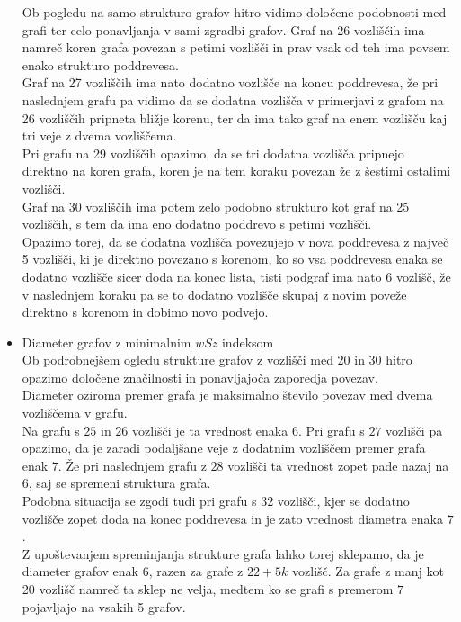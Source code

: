 \documentclass[12pt, a4paper]{article}
\begin{document}
\begin{itemize}
Ob pogledu na samo strukturo grafov hitro vidimo določene podobnosti med grafi ter celo ponavljanja v sami zgradbi grafov. Graf na 26 vozliščih ima namreč koren grafa povezan s petimi vozlišči in prav vsak od teh ima povsem enako strukturo poddrevesa. \\
Graf na 27 vozliščih ima nato dodatno vozlišče na koncu poddrevesa, že pri naslednjem grafu pa vidimo da se dodatna vozlišča v primerjavi z grafom na 26 vozliščih pripneta bližje korenu, ter da ima tako graf na enem vozlišču kaj tri veje z dvema vozliščema. \\
Pri grafu na 29 vozliščih opazimo, da se tri dodatna vozlišča pripnejo direktno na koren grafa, koren je na tem koraku povezan že z šestimi ostalimi vozlišči. \\
Graf na 30 vozliščih ima potem zelo podobno strukturo kot graf na 25 vozliščih, s tem da ima eno dodatno poddrevo s petimi vozlišči. \\
Opazimo torej, da se dodatna vozlišča povezujejo v nova poddrevesa z največ 5 vozlišči, ki je direktno povezano s korenom, ko so vsa poddrevesa enaka se dodatno vozlišče sicer doda na konec lista, tisti podgraf ima nato 6 vozlišč, že v naslednjem koraku pa se to dodatno vozlišče skupaj z novim poveže direktno s korenom in dobimo novo podvejo. 

\newpage

\large  \item  Diameter grafov z minimalnim $wSz$ indeksom\\ \linebreak
Ob podrobnejšem ogledu strukture grafov z vozlišči med 20 in 30 hitro opazimo določene značilnosti in ponavljajoča zaporedja povezav. \\
Diameter oziroma premer grafa je maksimalno število povezav med dvema vozliščema v grafu. \\
Na grafu s $25$ in $26$ vozlišči je ta vrednost enaka $6$. Pri grafu s $27$ vozlišči pa opazimo, da je zaradi podaljšane veje z dodatnim vozliščem premer grafa enak $7$. Že pri naslednjem grafu z $28$ vozlišči ta vrednost zopet pade nazaj na $6$, saj se spremeni struktura grafa. \\
Podobna situacija se zgodi tudi pri grafu s $32$ vozlišči, kjer se dodatno vozlišče zopet doda na konec poddrevesa in je zato vrednost diametra enaka $7$. \\
Z upoštevanjem spreminjanja strukture grafa lahko torej sklepamo, da je diameter grafov enak $6$, razen za grafe z $22 + 5k$ vozlišč. Za grafe z manj kot 20 vozlišč namreč ta sklep ne velja, medtem ko se grafi s premerom $7$ pojavljajo na vsakih 5 grafov.

\end{itemize}
\newpage
\end{document}
